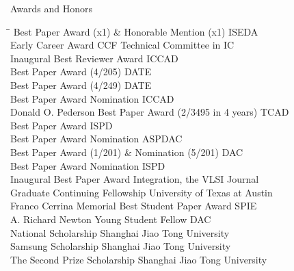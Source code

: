 
\begin{rSection}{Awards and Honors}
\begin{tabbing}
\hspace{3.8in}\= \hspace{2.6in}\= \kill
Best Paper Award (x1) \& Honorable Mention (x1) \> ISEDA  \\
Early Career Award \> CCF Technical Committee in IC  \\
Inaugural Best Reviewer Award \> ICCAD  \\
Best Paper Award (4/205) \> DATE  \\
Best Paper Award (4/249) \> DATE  \\
Best Paper Award Nomination \> ICCAD  \\
Donald O. Pederson Best Paper Award (2/3495 in 4 years) \> TCAD  \\
Best Paper Award \> ISPD  \\
Best Paper Award Nomination \> ASPDAC  \\
Best Paper Award (1/201) \& Nomination (5/201) \> DAC  \\
Best Paper Award Nomination \> ISPD  \\
Inaugural Best Paper Award \> Integration, the VLSI Journal  \\
Graduate Continuing Fellowship \> University of Texas at Austin  \\
Franco Cerrina Memorial Best Student Paper Award \> SPIE  \\
A. Richard Newton Young Student Fellow \> DAC  \\
    National Scholarship \> Shanghai Jiao Tong University  \\
    Samsung Scholarship \> Shanghai Jiao Tong University  \\
    The Second Prize Scholarship \> Shanghai Jiao Tong University 
\end{tabbing}
\end{rSection}

